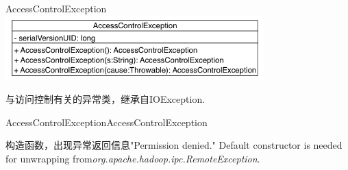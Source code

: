 \begin{XeClass}{AccessControlException}
\includegraphics[width=10cm]{cdig/AccessControlException.png}
     
 与访问控制有关的异常类，继承自IOException.

    \begin{XeMethod}{\XePublic}{AccessControlException}{AccessControlException}
         
 构造函数，出现异常返回信息"Permission denied."
 Default constructor is needed for unwrapping from\emph{org.apache.hadoop.ipc.RemoteException}.

    \end{XeMethod}

\end{XeClass}
